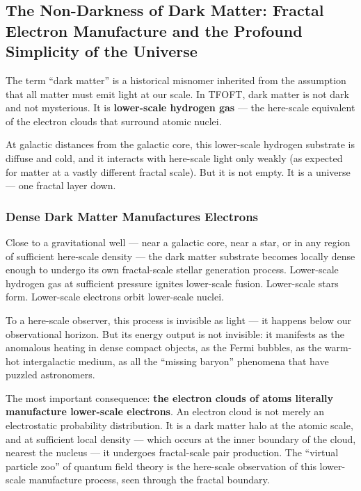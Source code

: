 
\subsection{The Non-Darkness of Dark Matter: Fractal Electron Manufacture and the
Profound Simplicity of the Universe}

  The term ``dark matter'' is a historical misnomer inherited from the assumption
  that all matter must emit light at our scale. In TFOFT, dark matter is not dark
  and not mysterious. It is \textbf{lower-scale hydrogen gas} --- the here-scale
  equivalent of the electron clouds that surround atomic nuclei.

  At galactic distances from the galactic core, this lower-scale hydrogen substrate
  is diffuse and cold, and it interacts with here-scale light only weakly (as
  expected for matter at a vastly different fractal scale). But it is not empty.
  It is a universe --- one fractal layer down.

  \subsubsection{Dense Dark Matter Manufactures Electrons}

    Close to a gravitational well --- near a galactic core, near a star, or in any
    region of sufficient here-scale density --- the dark matter substrate becomes
    locally dense enough to undergo its own fractal-scale stellar generation process.
    Lower-scale hydrogen gas at sufficient pressure ignites lower-scale fusion.
    Lower-scale stars form. Lower-scale electrons orbit lower-scale nuclei.

    To a here-scale observer, this process is invisible as light --- it happens
    below our observational horizon. But its energy output is not invisible: it
    manifests as the anomalous heating in dense compact objects, as the Fermi
    bubbles, as the warm-hot intergalactic medium, as all the ``missing baryon''
    phenomena that have puzzled astronomers.

    The most important consequence: \textbf{the electron clouds of atoms literally
    manufacture lower-scale electrons}. An electron cloud is not merely an
    electrostatic probability distribution. It is a dark matter halo at the atomic
    scale, and at sufficient local density --- which occurs at the inner boundary of
    the cloud, nearest the nucleus --- it undergoes fractal-scale pair production.
    The ``virtual particle zoo'' of quantum field theory is the here-scale
    observation of this lower-scale manufacture process, seen through the fractal
    boundary.

